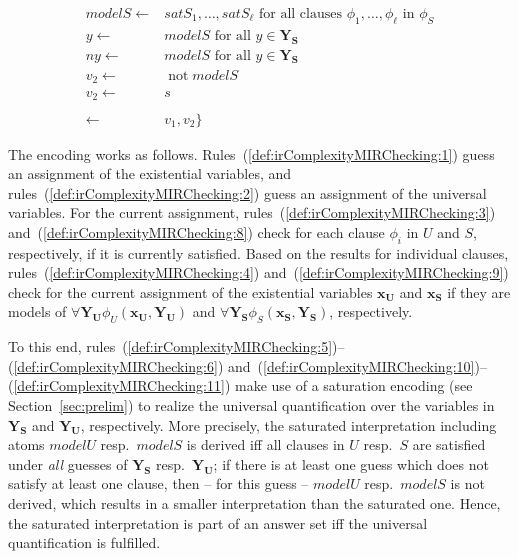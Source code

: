 \documentclass[11pt,fleqn,twoside]{article}
\renewcommand{\vec}[1]{\ensuremath{\mb{#1}}}
\newcommand{\mb}[1]{\ensuremath{\mathbf{#1}}}
\def\naf{\ensuremath{\mathop{not}}}
\begin{document}
{\begin{align}
						\mathit{modelS} \leftarrow& \mathit{satS}_1, \ldots, \mathit{satS}_\ell \text{ for all clauses } \phi_1, \ldots, \phi_\ell \text{ in } \phi_S \label{def:irComplexityMIRChecking:9} \\
						y \leftarrow& \mathit{modelS} \text{ for all } y \in \vec{Y_S} \label{def:irComplexityMIRChecking:10} \\
						\mathit{ny} \leftarrow& \mathit{modelS} \text{ for all } y \in \vec{Y_S} \label{def:irComplexityMIRChecking:11} \\
						\mathit{v_2} \leftarrow& \naf \mathit{modelS} \label{def:irComplexityMIRChecking:12} \\
						\mathit{v_2} \leftarrow& s \label{def:irComplexityMIRChecking:13} \\
						\nonumber \\
						\leftarrow& v_1, v_2 \} \label{def:irComplexityMIRChecking:14}
					\end{align}

					The encoding works as follows.
					Rules~(\ref{def:irComplexityMIRChecking:1}) guess an assignment of the existential variables,
					and rules~(\ref{def:irComplexityMIRChecking:2}) guess an assignment of the universal variables.
					For the current assignment, rules~(\ref{def:irComplexityMIRChecking:3}) and~(\ref{def:irComplexityMIRChecking:8}) check for each clause $\phi_i$ in $U$ and $S$, respectively,
					if it is currently satisfied. Based on the results for individual clauses,
					rules~(\ref{def:irComplexityMIRChecking:4}) and~(\ref{def:irComplexityMIRChecking:9}) check for the current assignment of the existential variables $\vec{x_U}$ and $\vec{x_S}$ if they are models of
					$\forall \vec{Y_U} \phi_U(\vec{x_U}, \vec{Y_U})$ and $\forall \vec{Y_S} \phi_S(\vec{x_S}, \vec{Y_S})$, respectively.

					To this end,
					rules~(\ref{def:irComplexityMIRChecking:5})--(\ref{def:irComplexityMIRChecking:6}) and~(\ref{def:irComplexityMIRChecking:10})--(\ref{def:irComplexityMIRChecking:11})
					make use of a saturation encoding (see Section~\ref{sec:prelim}) to realize the universal quantification over the variables in $\vec{Y_S}$ and $\vec{Y_U}$, respectively.
					More precisely, the saturated interpretation including atoms $\mathit{modelU}$ resp.~$\mathit{modelS}$ is derived iff all clauses in $U$ resp.~$S$
					are satisfied under \emph{all} guesses of $\vec{Y_S}$ resp.~$\vec{Y_U}$;
					if there is at least one guess which does not satisfy at least one clause, then -- for this guess -- $\mathit{modelU}$ resp.~$\mathit{modelS}$ is not derived,
					which results in a smaller interpretation than the saturated one. Hence, the saturated interpretation is part of an answer set iff the universal quantification is fulfilled.

}
\end{document}
